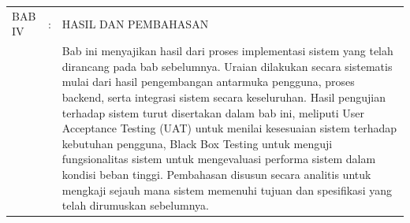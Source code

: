 \begin{longtable}{@{}llp{11cm}@{}}
    BAB IV         & : & HASIL DAN PEMBAHASAN                                                                                                                                                                                                                                                                                                                                                                                                                                                                                                                                                                                                                                                                                                                                                                           \\
                   &   & Bab ini menyajikan hasil dari proses implementasi sistem yang telah dirancang pada bab sebelumnya. Uraian dilakukan secara sistematis mulai dari hasil pengembangan antarmuka pengguna, proses backend, serta integrasi sistem secara keseluruhan. Hasil pengujian terhadap sistem turut disertakan dalam bab ini, meliputi User Acceptance Testing (UAT) untuk menilai kesesuaian sistem terhadap kebutuhan pengguna, Black Box Testing untuk menguji fungsionalitas sistem untuk mengevaluasi performa sistem dalam kondisi beban tinggi. Pembahasan disusun secara analitis untuk mengkaji sejauh mana sistem memenuhi tujuan dan spesifikasi yang telah dirumuskan sebelumnya.                                                                                                             \\[0.8em]


\end{longtable}
